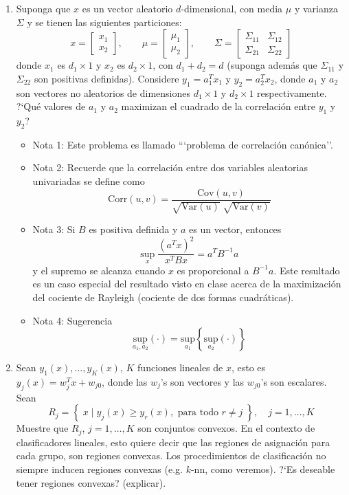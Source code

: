 \documentclass{article}
\begin{document}
\begin{sf}
\begin{enumerate}
\item Suponga que $x$ es un vector aleatorio $d$-dimensional, con
media $\mu$ y varianza $\Sigma$ y se tienen las siguientes particiones:
$$x = \left[\begin{array}{c} x_1 \\ x_2\end{array}\right], \qquad
\mu = \left[\begin{array}{c} \mu_1 \\ \mu_2\end{array}\right], \qquad
\Sigma = \left[\begin{array}{cc} \Sigma_{11} & \Sigma_{12} \\ \Sigma_{21} & \Sigma_{22}\end{array}\right]$$ 
donde $x_1$ es $d_1 \times 1$ y $x_2$ es $d_2 \times 1$, con $d_1+d_2=d$
(suponga adem\'as que $\Sigma_{11}$ y $\Sigma_{22}$ son positivas definidas). 
Considere $y_1=a_1^T x_1$ y $y_2=a_2^T x_2$, donde $a_1$ y $a_2$ son
vectores no aleatorios de dimensiones $d_1 \times 1$ y $d_2 \times 1$ respectivamente.
?`Qu\'e valores de $a_1$ y $a_2$ maximizan el cuadrado de la correlaci\'on
entre $y_1$ y $y_2$?
\begin{itemize}
\item Nota 1: Este problema es llamado ```problema de correlaci\'on can\'onica''.
\item Nota 2: Recuerde que la correlaci\'on entre dos variables aleatorias univariadas se define como
$$\text{Corr}(u,v) = \frac{\text{Cov}(u,v)}{\sqrt{\text{Var}(u)}  \; \sqrt{\text{Var}(v)}}$$
\item Nota 3: Si $B$ es positiva definida y $a$ es un vector, entonces
$$\underset{x}{\text{sup}} \; \frac{(a^Tx)^2}{x^TBx} = a^TB^{-1}a$$
y el supremo se alcanza cuando $x$ es proporcional a $B^{-1}a$.
Este resultado es un caso especial del resultado visto en clase acerca de
la maximizaci\'on del cociente de Rayleigh (cociente de dos formas cuadr\'aticas).
\item Nota 4: Sugerencia
$$\underset{a_1,a_2}{\text{sup}} ( \cdot ) = \underset{a_1}{\text{sup}} 
\left\{ \underset{a_2}{\text{sup}} (\cdot ) \right\}$$
\end{itemize}



\bigskip





\item Sean $y_1(x), \ldots, y_K(x)$, $K$ funciones lineales de $x$,
esto es $y_j(x) = w_j^Tx+w_{j0}$, donde las $w_j$'s son vectores y las
$w_{j0}$'s son escalares. Sean
$$R_j = \left\{\; x \; | \; y_j(x) \ge y_r(x), \text{ para todo } r \ne j \; \right\}, \quad j=1,\ldots , K$$
Muestre que $R_j$, $j=1,\ldots , K$ son conjuntos convexos.
En el contexto de clasificadores lineales, esto quiere decir que
las regiones de asignaci\'on para cada grupo, son regiones convexas.
Los procedimientos de clasificaci\'on no siempre inducen regiones convexas
(e.g. $k$-nn, como veremos). ?`Es deseable tener regiones convexas? (explicar).




\end{enumerate}
\end{sf}
\end{document}

